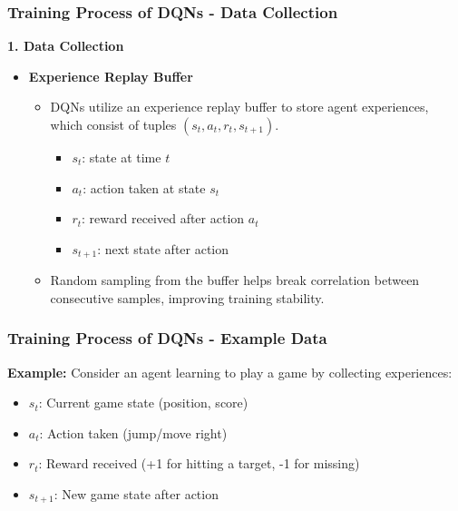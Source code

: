 \documentclass[aspectratio=169]{beamer}
\begin{document}
\begin{frame}[fragile]
    \frametitle{Training Process of DQNs - Data Collection}
    \textbf{1. Data Collection}
    \begin{itemize}
        \item \textbf{Experience Replay Buffer}
        \begin{itemize}
            \item DQNs utilize an experience replay buffer to store agent experiences, which consist of tuples \((s_t, a_t, r_t, s_{t+1})\).
            \begin{itemize}
                \item \(s_t\): state at time \(t\)
                \item \(a_t\): action taken at state \(s_t\)
                \item \(r_t\): reward received after action \(a_t\)
                \item \(s_{t+1}\): next state after action
            \end{itemize}
            \item Random sampling from the buffer helps break correlation between consecutive samples, improving training stability.
        \end{itemize}
    \end{itemize}
\end{frame}

\begin{frame}[fragile]
    \frametitle{Training Process of DQNs - Example Data}
    \textbf{Example:}
    Consider an agent learning to play a game by collecting experiences:
    \begin{itemize}
        \item \(s_t\): Current game state (position, score)
        \item \(a_t\): Action taken (jump/move right)
        \item \(r_t\): Reward received (+1 for hitting a target, -1 for missing)
        \item \(s_{t+1}\): New game state after action
    \end{itemize}
\end{frame}
\end{document}
